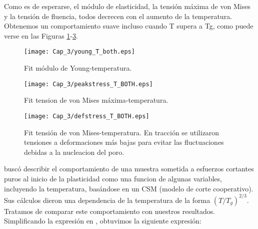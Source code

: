 Como es de esperarse, el módulo de elasticidad, la tensión máxima de von Mises y la tensión de fluencia, todos decrecen con el aumento de la temperatura. Obtenemos un comportamiento suave incluso cuando T supera a Tg, como puede verse en las Figuras \ref{C3:fg:youngVsT}-\ref{C3:fg:peakVMises1218VsT}.


\begin{figure}[htp]
\centering
\texttt{[image: Cap\_3/young\_T\_both.eps]}
\caption[Fit módulo de Young-temperatura.]{Fit módulo de Young-temperatura.}
\label{C3:fg:youngVsT}
\end{figure}

\begin{figure}[htp]
\centering
\texttt{[image: Cap\_3/peakstress\_T\_BOTH.eps]}
\caption[Fit tension de von Mises máxima-temperatura.]{Fit tension de von Mises máxima-temperatura.}
\label{C3:fg:peakVMisesVsT}
\end{figure}

\begin{figure}[htp]
\centering
\texttt{[image: Cap\_3/defstress\_T\_BOTH.eps]}
\caption[Fit tensión de von Mises-temperatura.]{Fit tensión de von Mises-temperatura. En tracción se utilizaron tensiones a deformaciones más bajas para evitar las fluctuaciones debidas a la nucleacion del poro.}
\label{C3:fg:peakVMises1218VsT}
\end{figure} 

\cite{cheng11} buscó describir el comportamiento de una muestra sometida a esfuerzos cortantes puros al inicio de la plasticidad  como una funcion de algunas variables, incluyendo la temperatura, basándose en un CSM (modelo de corte cooperativo). Sus cálculos dieron una dependencia de la temperatura de la forma $(T/T_g)^{2/3}$. Tratamos de comparar este comportamiento con nuestros resultados. Simplificando la expresión en \cite{cheng11}, obtuvimos la siguiente expresión:



